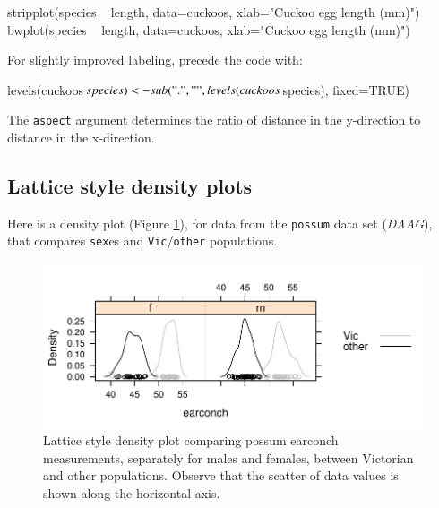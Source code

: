 \documentclass{tufte-book}\usepackage[]{graphicx}\usepackage[]{color}
\newcommand{\txtt}[1]{\texttt{#1}}
\begin{document}
\begin{Schunk}
\begin{Sinput}
stripplot(species ~ length, data=cuckoos,
          xlab="Cuckoo egg length (mm)")
bwplot(species ~ length, data=cuckoos,
       xlab="Cuckoo egg length (mm)")
\end{Sinput}
\end{Schunk}
\begin{marginfigure}[-36pt]
For slightly improved labeling, precede the code with:
\begin{Schunk}
\begin{Sinput}
levels(cuckoos$species) <-
 sub(".", " ",
  levels(cuckoos$species),
  fixed=TRUE)
\end{Sinput}
\end{Schunk}
\end{marginfigure}
The \txtt{aspect} argument determines the ratio of distance
in the y-direction to distance in the x-direction.

\subsection*{Lattice style density plots}
Here is a density plot (Figure \ref{fig:possumdens}), for data from
the \txtt{possum} data set (\textit{DAAG}), that compares \txtt{sex}es
and \txtt{Vic}/\txtt{other} populations.
\begin{figure}
\begin{center}
\begin{Schunk}


\centerline{\includegraphics[width=\textwidth]{figs/09-lattice-density-1} }

\end{Schunk}
\end{center}
  \caption{Lattice style density plot comparing possum earconch
    measurements, separately for males and females, between Victorian
    and other populations. Observe that the scatter of data values is
shown along the horizontal axis.}\label{fig:possumdens}
\vspace*{-36pt}
\end{figure}
\end{document}
